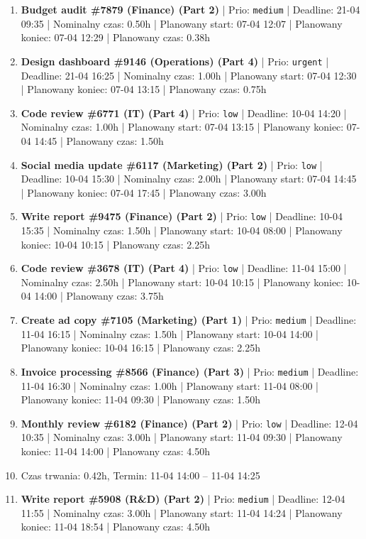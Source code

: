 {\begin{enumerate}
  \item [\textbf{14644}] \textbf{Budget audit \#7879 (Finance) (Part 2)} | Prio: \texttt{medium} | Deadline: 21-04 09:35 | Nominalny czas: 0.50h | Planowany start: 07-04 12:07 | Planowany koniec: 07-04 12:29 | Planowany czas: 0.38h
  \item [\textbf{14606}] \textbf{Design dashboard \#9146 (Operations) (Part 4)} | Prio: \texttt{urgent} | Deadline: 21-04 16:25 | Nominalny czas: 1.00h | Planowany start: 07-04 12:30 | Planowany koniec: 07-04 13:15 | Planowany czas: 0.75h
  \item [\textbf{14681}] \textbf{Code review \#6771 (IT) (Part 4)} | Prio: \texttt{low} | Deadline: 10-04 14:20 | Nominalny czas: 1.00h | Planowany start: 07-04 13:15 | Planowany koniec: 07-04 14:45 | Planowany czas: 1.50h
  \item [\textbf{14700}] \textbf{Social media update \#6117 (Marketing) (Part 2)} | Prio: \texttt{low} | Deadline: 10-04 15:30 | Nominalny czas: 2.00h | Planowany start: 07-04 14:45 | Planowany koniec: 07-04 17:45 | Planowany czas: 3.00h
  \item [\textbf{14685}] \textbf{Write report \#9475 (Finance) (Part 2)} | Prio: \texttt{low} | Deadline: 10-04 15:35 | Nominalny czas: 1.50h | Planowany start: 10-04 08:00 | Planowany koniec: 10-04 10:15 | Planowany czas: 2.25h
  \item [\textbf{14699}] \textbf{Code review \#3678 (IT) (Part 4)} | Prio: \texttt{low} | Deadline: 11-04 15:00 | Nominalny czas: 2.50h | Planowany start: 10-04 10:15 | Planowany koniec: 10-04 14:00 | Planowany czas: 3.75h
  \item [\textbf{14650}] \textbf{Create ad copy \#7105 (Marketing) (Part 1)} | Prio: \texttt{medium} | Deadline: 11-04 16:15 | Nominalny czas: 1.50h | Planowany start: 10-04 14:00 | Planowany koniec: 10-04 16:15 | Planowany czas: 2.25h
  \item [\textbf{14675}] \textbf{Invoice processing \#8566 (Finance) (Part 3)} | Prio: \texttt{medium} | Deadline: 11-04 16:30 | Nominalny czas: 1.00h | Planowany start: 11-04 08:00 | Planowany koniec: 11-04 09:30 | Planowany czas: 1.50h
  \item [\textbf{14690}] \textbf{Monthly review \#6182 (Finance) (Part 2)} | Prio: \texttt{low} | Deadline: 12-04 10:35 | Nominalny czas: 3.00h | Planowany start: 11-04 09:30 | Planowany koniec: 11-04 14:00 | Planowany czas: 4.50h
  \item [\textbf{PRZERWA}] Czas trwania: 0.42h, Termin: 11-04 14:00 -- 11-04 14:25
  \item [\textbf{14674}] \textbf{Write report \#5908 (R\&D) (Part 2)} | Prio: \texttt{medium} | Deadline: 12-04 11:55 | Nominalny czas: 3.00h | Planowany start: 11-04 14:24 | Planowany koniec: 11-04 18:54 | Planowany czas: 4.50h

\end{enumerate}}
